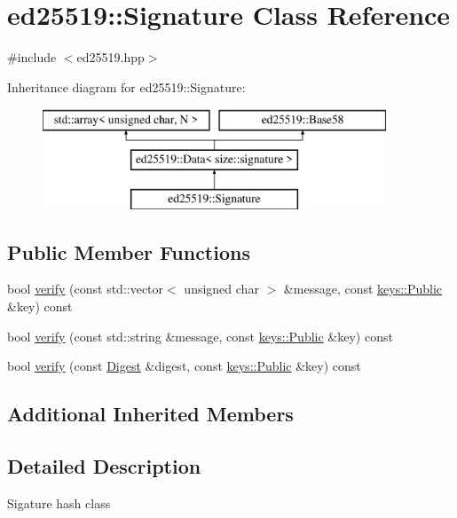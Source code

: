 \hypertarget{classed25519_1_1_signature}{}\section{ed25519\+:\+:Signature Class Reference}
\label{classed25519_1_1_signature}


{\ttfamily \#include $<$ed25519.\+hpp$>$}

Inheritance diagram for ed25519\+:\+:Signature\+:\begin{figure}[H]
\begin{center}
\leavevmode
\includegraphics[height=3.000000cm]{classed25519_1_1_signature}
\end{center}
\end{figure}
\subsection*{Public Member Functions}
\begin{DoxyCompactItemize}
\item 
bool \mbox{\hyperlink{classed25519_1_1_signature_aca2ff60a3e305730cd62e7005b92cfef}{verify}} (const std\+::vector$<$ unsigned char $>$ \&message, const \mbox{\hyperlink{classed25519_1_1keys_1_1_public}{keys\+::\+Public}} \&key) const
\item 
bool \mbox{\hyperlink{classed25519_1_1_signature_a365b186127ea5150dd233c9c89ac4faf}{verify}} (const std\+::string \&message, const \mbox{\hyperlink{classed25519_1_1keys_1_1_public}{keys\+::\+Public}} \&key) const
\item 
bool \mbox{\hyperlink{classed25519_1_1_signature_a906ffca7764e7879438a9c60d96ff207}{verify}} (const \mbox{\hyperlink{structed25519_1_1_digest}{Digest}} \&digest, const \mbox{\hyperlink{classed25519_1_1keys_1_1_public}{keys\+::\+Public}} \&key) const
\end{DoxyCompactItemize}
\subsection*{Additional Inherited Members}


\subsection{Detailed Description}
Sigature hash class 

